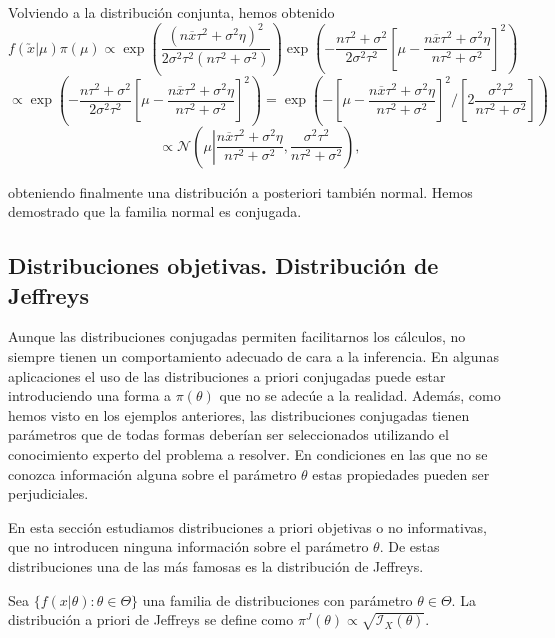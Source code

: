 \begin{ex}
Volviendo a la distribución conjunta, hemos obtenido
\[f(\utilde{x}|\mu)\pi(\mu) \propto
\exp{\left(\frac{\left(n\overline{x}\tau^2+\sigma^2\eta\right)^2}{2\sigma^2\tau^2\left(n\tau^2+\sigma^2\right)}\right)}
\exp{\left(-\frac{n\tau^2+\sigma^2}{2\sigma^2\tau^2}\left[\mu-\frac{n\overline{x}\tau^2+\sigma^2\eta}{n\tau^2+\sigma^2}\right]^2\right)}
\]
\[ \propto
\exp{\left(-\frac{n\tau^2+\sigma^2}{2\sigma^2\tau^2}\left[\mu-\frac{n\overline{x}\tau^2+\sigma^2\eta}{n\tau^2+\sigma^2}\right]^2\right)}
=
\exp{\left(-\left[\mu-\frac{n\overline{x}\tau^2+\sigma^2\eta}{n\tau^2+\sigma^2}\right]^2 / \left[2\frac{\sigma^2\tau^2}{n\tau^2+\sigma^2}\right]\right)}
\]
\[
\propto \mathcal{N}\left(\mu\left|\frac{n\overline{x}\tau^2+\sigma^2\eta}{n\tau^2+\sigma^2},\frac{\sigma^2\tau^2}{n\tau^2+\sigma^2}\right.\right),
\]

obteniendo finalmente una distribución a posteriori también normal. Hemos demostrado que la familia normal es conjugada.
\end{ex}


\subsection{Distribuciones objetivas. Distribución de Jeffreys}

Aunque las distribuciones conjugadas permiten facilitarnos los cálculos, no siempre tienen un comportamiento adecuado de cara a la inferencia. En algunas aplicaciones el uso de las distribuciones a priori conjugadas puede estar introduciendo una forma a $\pi(\theta)$ que no se adecúe a la realidad. Además, como hemos visto en los ejemplos anteriores, las distribuciones conjugadas tienen parámetros que de todas formas deberían ser seleccionados utilizando el conocimiento experto del problema a resolver. En condiciones en las que no se conozca información alguna sobre el parámetro $\theta$ estas propiedades pueden ser perjudiciales.

En esta sección estudiamos distribuciones a priori objetivas o no informativas, que no introducen ninguna información sobre el parámetro $\theta$. De estas distribuciones una de las más famosas es la distribución de Jeffreys.

\begin{definition}
    Sea $\{f(x | \theta): \theta \in \Theta \}$ una familia de distribuciones con parámetro $\theta \in \Theta$. La distribución a priori de Jeffreys se define como $\pi^{J}(\theta) \propto \sqrt{\mathcal{I}_X(\theta)}$.
\end{definition}

